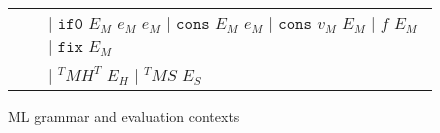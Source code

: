\begin{figure}[p]
\begin{tabular}{lcl}
\vspace{5pt}

&& $\vert$ $\mathtt{if0}$ $E_{M}$ $e_{M}$ $e_{M}$ $\vert$ $\mathtt{cons}$ $E_{M}$ $e_{M}$ $\vert$ $\mathtt{cons}$ $v_{M}$ $E_{M}$ $\vert$ $f$ $E_{M}$ $\vert$ $\mathtt{fix}$ $E_{M}$ \\

\vspace{5pt}

&& $\vert$ $^{T}MH^{T}$ $E_{H}$ $\vert$ $^{T}MS$ $E_{S}$
\end{tabular}
\caption{ML grammar and evaluation contexts}
\label{mg}
\end{figure}